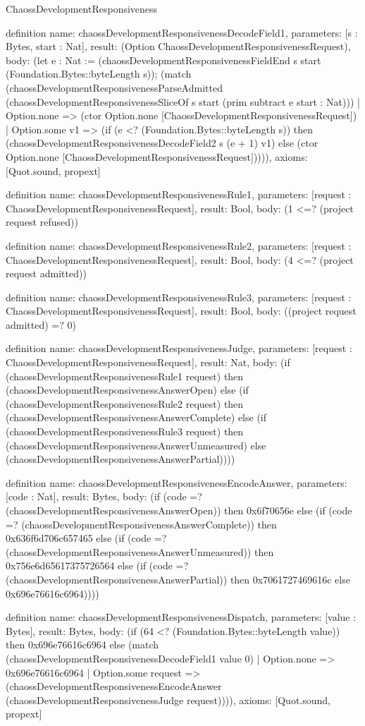 \begin{lexlean}{ChaossDevelopmentResponsiveness}
\begin{semanticmodule}
definition{
  name: chaossDevelopmentResponsivenessDecodeField1,
  parameters: [s : Bytes, start : Nat],
  result: (Option ChaossDevelopmentResponsivenessRequest),
  body: (let e : Nat := (chaossDevelopmentResponsivenessFieldEnd s start (Foundation.Bytes::byteLength s)); (match (chaossDevelopmentResponsivenessParseAdmitted (chaossDevelopmentResponsivenessSliceOf s start (prim subtract e start : Nat)))
    | Option.none => (ctor Option.none [ChaossDevelopmentResponsivenessRequest])
    | Option.some v1 => (if (e <? (Foundation.Bytes::byteLength s)) then (chaossDevelopmentResponsivenessDecodeField2 s (e + 1) v1) else (ctor Option.none [ChaossDevelopmentResponsivenessRequest])))),
  axioms: [Quot.sound, propext]
}

definition{
  name: chaossDevelopmentResponsivenessRule1,
  parameters: [request : ChaossDevelopmentResponsivenessRequest],
  result: Bool,
  body: (1 <=? (project request refused))
}

definition{
  name: chaossDevelopmentResponsivenessRule2,
  parameters: [request : ChaossDevelopmentResponsivenessRequest],
  result: Bool,
  body: (4 <=? (project request admitted))
}

definition{
  name: chaossDevelopmentResponsivenessRule3,
  parameters: [request : ChaossDevelopmentResponsivenessRequest],
  result: Bool,
  body: ((project request admitted) =? 0)
}

definition{
  name: chaossDevelopmentResponsivenessJudge,
  parameters: [request : ChaossDevelopmentResponsivenessRequest],
  result: Nat,
  body: (if (chaossDevelopmentResponsivenessRule1 request) then (chaossDevelopmentResponsivenessAnswerOpen) else (if (chaossDevelopmentResponsivenessRule2 request) then (chaossDevelopmentResponsivenessAnswerComplete) else (if (chaossDevelopmentResponsivenessRule3 request) then (chaossDevelopmentResponsivenessAnswerUnmeasured) else (chaossDevelopmentResponsivenessAnswerPartial))))
}

definition{
  name: chaossDevelopmentResponsivenessEncodeAnswer,
  parameters: [code : Nat],
  result: Bytes,
  body: (if (code =? (chaossDevelopmentResponsivenessAnswerOpen)) then 0x6f70656e else (if (code =? (chaossDevelopmentResponsivenessAnswerComplete)) then 0x636f6d706c657465 else (if (code =? (chaossDevelopmentResponsivenessAnswerUnmeasured)) then 0x756e6d65617375726564 else (if (code =? (chaossDevelopmentResponsivenessAnswerPartial)) then 0x7061727469616c else 0x696e76616c6964))))
}

definition{
  name: chaossDevelopmentResponsivenessDispatch,
  parameters: [value : Bytes],
  result: Bytes,
  body: (if (64 <? (Foundation.Bytes::byteLength value)) then 0x696e76616c6964 else (match (chaossDevelopmentResponsivenessDecodeField1 value 0)
    | Option.none => 0x696e76616c6964
    | Option.some request => (chaossDevelopmentResponsivenessEncodeAnswer (chaossDevelopmentResponsivenessJudge request)))),
  axioms: [Quot.sound, propext]
}
\end{semanticmodule}
\end{lexlean}

